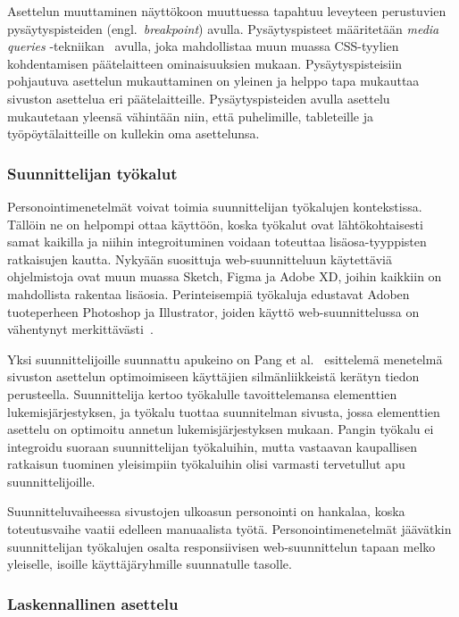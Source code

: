 \documentclass[finnish, 12pt, a4paper, elec, utf8, a-1b]{aaltothesis}
\begin{document}
Asettelun muuttaminen näyttökoon muuttuessa tapahtuu leveyteen perustuvien
pysäytyspisteiden (engl.~\textit{breakpoint}) avulla. Pysäytyspisteet
määritetään \textit{media queries} -tekniikan~\cite{Rivoal:12:MQ} avulla, joka
mahdollistaa muun muassa CSS-tyylien kohdentamisen päätelaitteen ominaisuuksien
mukaan. Pysäytyspisteisiin pohjautuva asettelun mukauttaminen on yleinen ja
helppo tapa mukauttaa sivuston asettelua eri päätelaitteille. Pysäytyspisteiden
avulla asettelu mukautetaan yleensä vähintään niin, että puhelimille,
tableteille ja työpöytälaitteille on kullekin oma asettelunsa.

\subsubsection{Suunnittelijan työkalut}

Personointimenetelmät voivat toimia suunnittelijan työkalujen kontekstissa.
Tällöin ne on helpompi ottaa käyttöön, koska työkalut ovat lähtökohtaisesti
samat kaikilla ja niihin integroituminen voidaan toteuttaa lisäosa-tyyppisten
ratkaisujen kautta. Nykyään suosittuja web-suunnitteluun käytettäviä
ohjelmistoja ovat muun muassa Sketch, Figma ja Adobe XD, joihin kaikkiin on
mahdollista rakentaa lisäosia. Perinteisempiä työkaluja edustavat Adoben
tuoteperheen Photoshop ja Illustrator, joiden käyttö web-suunnittelussa on
vähentynyt merkittävästi~\cite{webdesignmuseum_2022}.

Yksi suunnittelijoille suunnattu apukeino on Pang et al.~\cite{10.1145/2980179.2982422}
esittelemä menetelmä sivuston asettelun optimoimiseen käyttäjien
silmänliikkeistä kerätyn tiedon perusteella. Suunnittelija kertoo työkalulle
tavoittelemansa elementtien lukemisjärjestyksen, ja työkalu tuottaa suunnitelman
sivusta, jossa elementtien asettelu on optimoitu annetun lukemisjärjestyksen
mukaan. Pangin työkalu ei integroidu suoraan suunnittelijan työkaluihin, mutta
vastaavan kaupallisen ratkaisun tuominen yleisimpiin työkaluihin olisi varmasti
tervetullut apu suunnittelijoille.

Suunnitteluvaiheessa sivustojen ulkoasun personointi on hankalaa, koska
toteutusvaihe vaatii edelleen manuaalista työtä. Personointimenetelmät jäävätkin
suunnittelijan työkalujen osalta responsiivisen web-suunnittelun tapaan melko
yleiselle, isoille käyttäjäryhmille suunnatulle tasolle.

\subsubsection{Laskennallinen asettelu}
\end{document}
